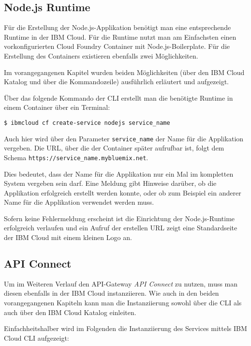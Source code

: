 \subsection{Node.js Runtime}
\label{ssc:nodejs_runtime}
Für die Erstellung der Node.js-Applikation benötigt man eine entsprechende Runtime in der IBM Cloud. Für die Runtime
nutzt man am Einfachsten einen vorkonfigurierten Cloud Foundry Container mit Node.js-Boilerplate. Für die Erstellung
des Containers existieren ebenfalls zwei Möglichkeiten.

Im vorangegangenen Kapitel wurden beiden Möglichkeiten (über den IBM Cloud Katalog und über die Kommandozeile)
ausführlich erläutert und aufgezeigt.

Über das folgende Kommando der CLI erstellt man die benötigte Runtime in einem Container über ein Terminal:

\begin{lstlisting}[caption=Instanziierung der Node.js Runtime, label=ls:vorbereitung_nodejstensorflow]
    $ ibmcloud cf create-service nodejs service_name
\end{lstlisting}

Auch hier wird über den Parameter \texttt{service\_name} der Name für die Applikation vergeben. Die URL, über die der
Container später aufrufbar ist, folgt dem Schema \texttt{https://service\_name.mybluemix.net}.

Dies bedeutet, dass der Name für die Applikation nur ein Mal im kompletten System vergeben sein darf. Eine Meldung gibt
Hinweise darüber, ob die Applikation erfolgreich erstellt werden konnte, oder ob zum Beispiel ein anderer Name für die
Applikation verwendet werden muss.

Sofern keine Fehlermeldung erscheint ist die Einrichtung der Node.js-Runtime erfolgreich verlaufen und ein Aufruf der
erstellen URL zeigt eine Standardseite der IBM Cloud mit einem kleinen Logo an.

\subsection{API Connect}
\label{subsec:vorbereitung_apiconnect}
Um im Weiteren Verlauf den API-Gateway \textit{API Connect} zu nutzen, muss man diesen ebenfalls in der IBM Cloud
instanziieren. Wie auch in den beiden vorangegangenen Kapiteln kann man die Instanziierung sowohl über die CLI als auch
über den IBM Cloud Katalog einleiten.

Einfachheitshalber wird im Folgenden die Instanziierung des Services mittels IBM Cloud CLI aufgezeigt:

